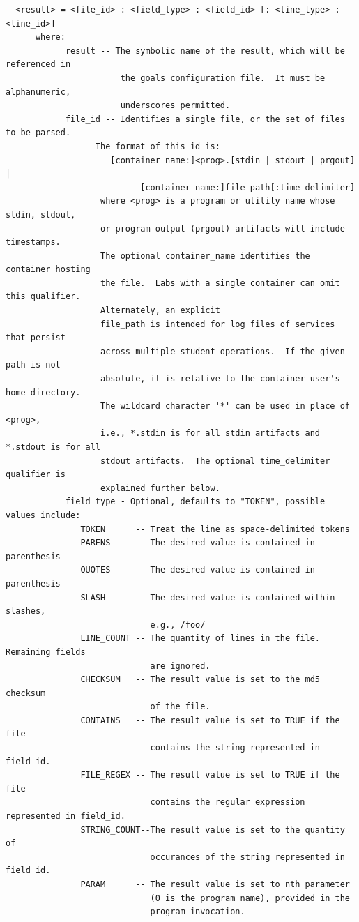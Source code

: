 \documentclass[12pt]{article}
\begin{document}
\begin{verbatim}
  <result> = <file_id> : <field_type> : <field_id> [: <line_type> : <line_id>]
      where:
            result -- The symbolic name of the result, which will be referenced in 
                       the goals configuration file.  It must be alphanumeric, 
                       underscores permitted.
            file_id -- Identifies a single file, or the set of files to be parsed.  
                  The format of this id is:
                     [container_name:]<prog>.[stdin | stdout | prgout] | 
                           [container_name:]file_path[:time_delimiter]
                   where <prog> is a program or utility name whose stdin, stdout,
                   or program output (prgout) artifacts will include timestamps.  
                   The optional container_name identifies the container hosting 
                   the file.  Labs with a single container can omit this qualifier.  
                   Alternately, an explicit 
                   file_path is intended for log files of services that persist 
                   across multiple student operations.  If the given path is not 
                   absolute, it is relative to the container user's home directory. 
                   The wildcard character '*' can be used in place of <prog>,
                   i.e., *.stdin is for all stdin artifacts and *.stdout is for all 
                   stdout artifacts.  The optional time_delimiter qualifier is 
                   explained further below.
            field_type - Optional, defaults to "TOKEN", possible values include:
               TOKEN      -- Treat the line as space-delimited tokens
               PARENS     -- The desired value is contained in parenthesis
               QUOTES     -- The desired value is contained in parenthesis
               SLASH      -- The desired value is contained within slashes, 
                             e.g., /foo/
               LINE_COUNT -- The quantity of lines in the file. Remaining fields 
                             are ignored.
               CHECKSUM   -- The result value is set to the md5 checksum 
                             of the file.
               CONTAINS   -- The result value is set to TRUE if the file 
                             contains the string represented in field_id.
               FILE_REGEX -- The result value is set to TRUE if the file 
                             contains the regular expression represented in field_id.
               STRING_COUNT--The result value is set to the quantity of
                             occurances of the string represented in field_id.
               PARAM      -- The result value is set to nth parameter
                             (0 is the program name), provided in the 
                             program invocation.  
                             

\end{verbatim}
\end{document}
